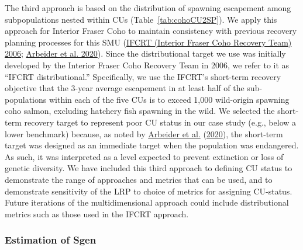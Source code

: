 \documentclass[11pt]{book}
\begin{document}
The third approach is based on the distribution of spawning escapement among subpopulations nested within CUs (Table~\ref{tab:cohoCU2SP}). We apply this approach for Interior Fraser Coho to maintain consistency with previous recovery planning processes for this SMU (\protect\hyperlink{ref-ifcrtinteriorfrasercohorecoveryteamConservationStrategyCoho2006}{IFCRT (Interior Fraser Coho Recovery Team) 2006}; \protect\hyperlink{ref-arbeiderInteriorFraserCoho2020}{Arbeider et al. 2020}). Since the distributional target we use was initially developed by the Interior Fraser Coho Recovery Team in 2006, we refer to it as ``IFCRT distributional.'' Specifically, we use the IFCRT's short-term recovery objective that the 3-year average escapement in at least half of the sub-populations within each of the five CUs is to exceed 1,000 wild-origin spawning coho salmon, excluding hatchery fish spawning in the wild. We selected the short-term recovery target to represent poor CU status in our case study (e.g., below a lower benchmark) because, as noted by \protect\hyperlink{ref-arbeiderInteriorFraserCoho2020}{Arbeider et al.} (\protect\hyperlink{ref-arbeiderInteriorFraserCoho2020}{2020}), the short-term target was designed as an immediate target when the population was endangered. As such, it was interpreted as a level expected to prevent extinction or loss of genetic diversity. We have included this third approach to defining CU status to demonstrate the range of approaches and metrics that can be used, and to demonstrate sensitivity of the LRP to choice of metrics for assigning CU-status. Future iterations of the multidimensional approach could include distributional metrics such as those used in the IFCRT approach.

\hypertarget{cohoSgen}{%
\subsubsection{Estimation of Sgen}\label{cohoSgen}}
\end{document}
